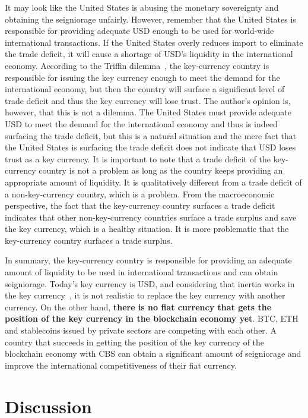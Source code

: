 \documentclass[dvipdfmx,a4paper]{article}
\begin{document}
It may look like the United States is abusing the monetary sovereignty and obtaining the seigniorage unfairly. However, remember that the United States is responsible for providing adequate USD enough to be used for world-wide international transactions. If the United States overly reduces import to eliminate the trade deficit, it will cause a shortage of USD's liquidity in the international economy. According to the Triffin dilemma~\cite{bordo2019triffin}, the key-currency country is responsible for issuing the key currency enough to meet the demand for the international economy, but then the country will surface a significant level of trade deficit and thus the key currency will lose trust. The author's opinion is, however, that this is not a dilemma. The United States must provide adequate USD to meet the demand for the international economy and thus is indeed surfacing the trade deficit, but this is a natural situation and the mere fact that the United States is surfacing the trade deficit does not indicate that USD loses trust as a key currency. It is important to note that a trade deficit of the key-currency country is not a problem as long as the country keeps providing an appropriate amount of liquidity. It is qualitatively different from a trade deficit of a non-key-currency country, which is a problem. From the macroeconomic perspective, the fact that the key-currency country surfaces a trade deficit indicates that other non-key-currency countries surface a trade surplus and save the key currency, which is a healthy situation. It is more problematic that the key-currency country surfaces a trade surplus.

In summary, the key-currency country is responsible for providing an adequate amount of liquidity to be used in international transactions and can obtain seigniorage. Today's key currency is USD, and considering that inertia works in the key currency~\cite{goldberg2010international}, it is not realistic to replace the key currency with another currency. On the other hand, \textbf{there is no fiat currency that gets the position of the key currency in the blockchain economy yet}. BTC, ETH and stablecoins issued by private sectors are competing with each other. A country that succeeds in getting the position of the key currency of the blockchain economy with CBS can obtain a significant amount of seigniorage and improve the international competitiveness of their fiat currency.

\section{Discussion}
\end{document}
